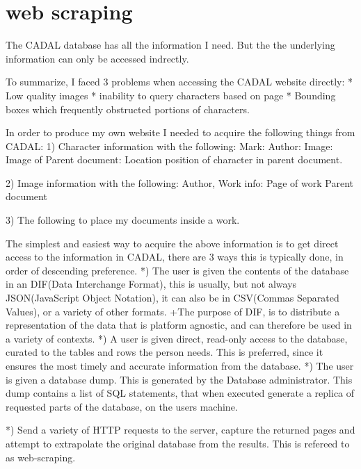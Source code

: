 \chapter{web scraping}

The CADAL database has all the information I need.  But the the underlying information can only be accessed indrectly.

    To summarize, I faced 3 problems when accessing the CADAL website directly:
        *  Low quality images
        *  inability to query characters based on page
        *  Bounding boxes which frequently obstructed portions of characters.
                   



    In order to produce my own website I needed to acquire the following things from CADAL:
        1)  Character information with the following:
            Mark:
            Author:
            Image:
            Image of Parent document:
            Location position of character in parent document.
        
        2)  Image information with the following:
            Author,
            Work info:
                Page of work
                Parent document
            
        3)    The following to place my documents inside a work.
                
            The simplest and easiest way to acquire the above information is to get direct access to the information in CADAL, there are 3 ways this is typically done, in order of descending preference.
            *)  The user is given the contents of the database in an DIF(Data Interchange Format), this is usually, but not always JSON(JavaScript Object Notation), it can also be in CSV(Commas Separated Values), or a variety of other formats.
                +The purpose of DIF, is to distribute a representation of the data that is platform agnostic, and can  therefore be used in a variety of contexts.
            *)  A user is given direct, read-only access to the database, curated to the tables and rows the person needs.  This is preferred, since it ensures the most timely and accurate information from the database.
            *)  The user is given a database dump.  This is generated by the Database administrator.  This dump contains a list of SQL statements, that when executed generate a replica of requested parts of the database, on the users machine.

            *)  Send a variety of HTTP requests to the server, capture the returned pages and attempt to extrapolate the original database from the results.  This is refereed to as web-scraping.
            
